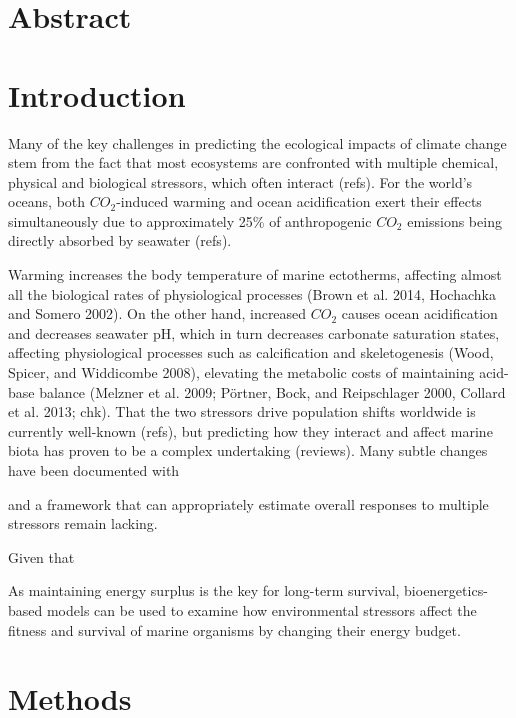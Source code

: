 \documentclass[oneside, a4paper]{memoir}
\theoremstyle{definition}
\theoremstyle{definition}
\theoremstyle{definition}
\theoremstyle{remark}
\begin{document}

\section*{Abstract}\label{abstract}

\section{Introduction}\label{introduction}

Many of the key challenges in predicting the ecological impacts of
climate change stem from the fact that most ecosystems are confronted
with multiple chemical, physical and biological stressors, which often
interact (refs). For the world's oceans, both \(CO_2\)-induced warming
and ocean acidification exert their effects simultaneously due to
approximately 25\% of anthropogenic \(CO_2\) emissions being directly
absorbed by seawater (refs).

Warming increases the body temperature of marine ectotherms, affecting
almost all the biological rates of physiological processes (Brown et al.
2014, Hochachka and Somero 2002). On the other hand, increased \(CO_2\)
causes ocean acidification and decreases seawater pH, which in turn
decreases carbonate saturation states, affecting physiological processes
such as calcification and skeletogenesis (Wood, Spicer, and Widdicombe
2008), elevating the metabolic costs of maintaining acid-base balance
(Melzner et al. 2009; Pörtner, Bock, and Reipschlager 2000, Collard et
al. 2013; chk). That the two stressors drive population shifts worldwide
is currently well-known (refs), but predicting how they interact and
affect marine biota has proven to be a complex undertaking (reviews).
Many subtle changes have been documented with

and a framework that can appropriately estimate overall responses to
multiple stressors remain lacking.

Given that

As maintaining energy surplus is the key for long-term survival,
bioenergetics-based models can be used to examine how environmental
stressors affect the fitness and survival of marine organisms by
changing their energy budget.

\section{Methods}\label{methods}
\end{document}
